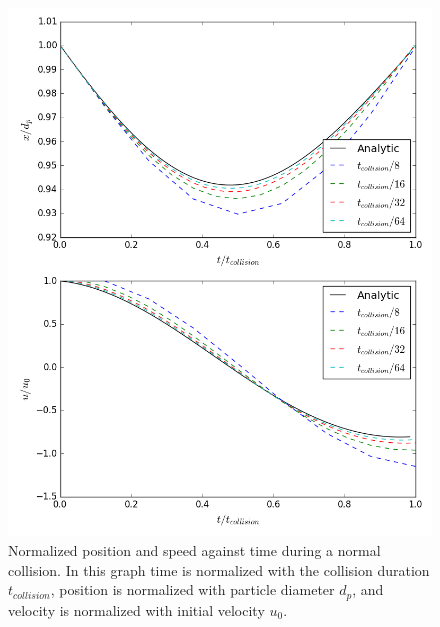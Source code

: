 \documentclass[a4paper,11pt,titlepage]{report}
\begin{document}
\begin{figure}[!htb]
\centering
\includegraphics[scale=0.55]{figures/python_verification/normal_force_verification.png}
\caption{Normalized position and speed against time during a normal collision. In this graph time is normalized with the collision duration $t_{collision}$, position is normalized with particle diameter $d_p$, and velocity is normalized with initial velocity $u_0$.}
\label{fig:python_normal_force_verification}
\end{figure}
\end{document}

